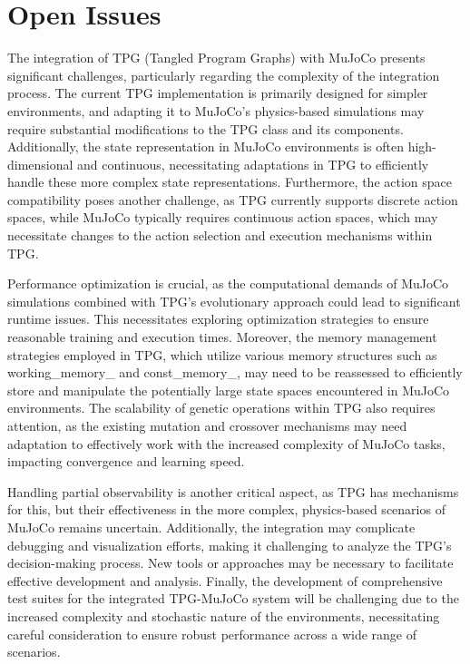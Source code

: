 \documentclass[12pt]{article}
\begin{document}
\section{Open Issues}
The integration of TPG (Tangled Program Graphs) with MuJoCo presents significant challenges, particularly regarding the complexity of the integration process. The current TPG implementation is primarily designed for simpler environments, and adapting it to MuJoCo's physics-based simulations may require substantial modifications to the TPG class and its components. Additionally, the state representation in MuJoCo environments is often high-dimensional and continuous, necessitating adaptations in TPG to efficiently handle these more complex state representations. Furthermore, the action space compatibility poses another challenge, as TPG currently supports discrete action spaces, while MuJoCo typically requires continuous action spaces, which may necessitate changes to the action selection and execution mechanisms within TPG.

Performance optimization is crucial, as the computational demands of MuJoCo simulations combined with TPG's evolutionary approach could lead to significant runtime issues. This necessitates exploring optimization strategies to ensure reasonable training and execution times. Moreover, the memory management strategies employed in TPG, which utilize various memory structures such as working\_memory\_ and const\_memory\_, may need to be reassessed to efficiently store and manipulate the potentially large state spaces encountered in MuJoCo environments. The scalability of genetic operations within TPG also requires attention, as the existing mutation and crossover mechanisms may need adaptation to effectively work with the increased complexity of MuJoCo tasks, impacting convergence and learning speed.

Handling partial observability is another critical aspect, as TPG has mechanisms for this, but their effectiveness in the more complex, physics-based scenarios of MuJoCo remains uncertain. Additionally, the integration may complicate debugging and visualization efforts, making it challenging to analyze the TPG's decision-making process. New tools or approaches may be necessary to facilitate effective development and analysis. Finally, the development of comprehensive test suites for the integrated TPG-MuJoCo system will be challenging due to the increased complexity and stochastic nature of the environments, necessitating careful consideration to ensure robust performance across a wide range of scenarios.
\end{document}
